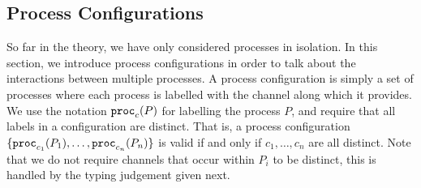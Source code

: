 \documentclass[a4paper,USenglish]{lipics-v2016}
\begin{document}


\subsection{Process Configurations}

So far in the theory, we have only considered processes in isolation. In this section, we introduce process configurations in order to talk about the interactions between multiple processes. A process configuration is simply a set of processes where each process is labelled with the channel along which it provides. We use the notation $\mathtt{proc}_{c}(P)$ for labelling the process $P$, and require that all labels in a configuration are distinct. That is, a process configuration $\lbrace\mathtt{proc}_{c_1}(P_1), \ldots, \mathtt{proc}_{c_n}(P_n)\rbrace$ is valid if and only if $c_1, \ldots, c_n$ are all distinct. Note that we do not require channels that occur within $P_i$ to be distinct, this is handled by the typing judgement given next.
\end{document}
